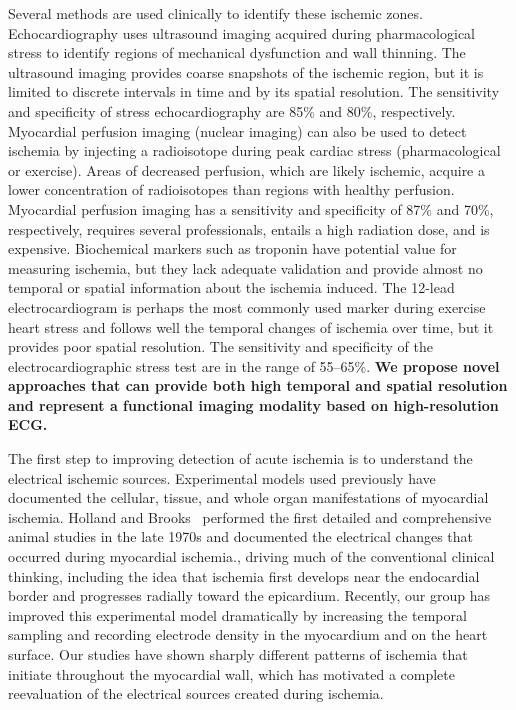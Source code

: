 Several methods are used clinically to identify these ischemic
zones. Echocardiography uses ultrasound imaging acquired during
pharmacological stress to identify regions of mechanical dysfunction and
wall thinning.\cite{BLZ:Man1988,BLZ:Gre1997,KKA:Gel97} The ultrasound
imaging provides coarse snapshots of the ischemic region, but it is limited to
discrete intervals in time and by its spatial resolution.\cite{BLZ:Saf2018}
The sensitivity and specificity of stress echocardiography are 85\% and
80\%, respectively.\cite{BLZ:Knu2018a} Myocardial perfusion
imaging (nuclear imaging) can also be used to detect ischemia by injecting
a radioisotope during peak cardiac stress (pharmacological or
exercise). Areas of decreased perfusion, which are likely ischemic,
acquire a lower concentration of radioisotopes than regions with
healthy perfusion. Myocardial perfusion imaging has a sensitivity and specificity of
87\% and 70\%, respectively, requires several professionals, entails a high
radiation dose, and is expensive.\cite{BLZ:Knu2018a} Biochemical markers
such as troponin have potential value for measuring ischemia, but they lack
adequate validation and provide almost no temporal or spatial information
about the ischemia induced.\cite{BLZ:Saf2018} The 12-lead electrocardiogram
is perhaps the most commonly used marker during exercise heart stress and
follows well the temporal changes of ischemia over time, but it provides poor
spatial resolution. The sensitivity and specificity of the
electrocardiographic stress test are in the range of 55--65\%.\cite{BLZ:Knu2018a,
  RSM:Ste2002} \textbf{We propose novel approaches that can provide both
  high temporal and spatial resolution and represent a functional imaging
  modality based on high-resolution ECG.}

The first step to improving detection of acute ischemia is to understand
the electrical ischemic sources. Experimental models used previously have
documented the cellular, tissue, and whole organ manifestations of
myocardial ischemia.\cite{BMB:Hol77a,BMB:Hol77b,BLZ:Kle1978,
  RSM:Jan80,KKA:Cin80,RSM:Cha89,RSM:Mac95e,RSM:Mac97} Holland and Brooks
\etal~performed the first detailed and comprehensive animal studies in the
late 1970s and documented the electrical changes that occurred during
myocardial ischemia.\cite{BMB:Hol77a,BMB:Hol77b}, driving much of the
conventional clinical thinking, including the idea that ischemia first
develops near the endocardial border and progresses radially toward the
epicardium.\cite{BMB:Hol77a,BMB:Hol77b,BMB:Kat2011} Recently, our group has
improved this experimental model dramatically by increasing the temporal
sampling and recording electrode density in the myocardium and on the heart
surface.\cite{RSM:Sho2007,RSM:Ara2009,RSM:Ara2011, BMB:Ara2015,BMB:Ara2016}
Our studies have shown sharply different patterns of ischemia that initiate
throughout the myocardial wall, which has motivated a complete reevaluation
of the electrical sources created during ischemia.

